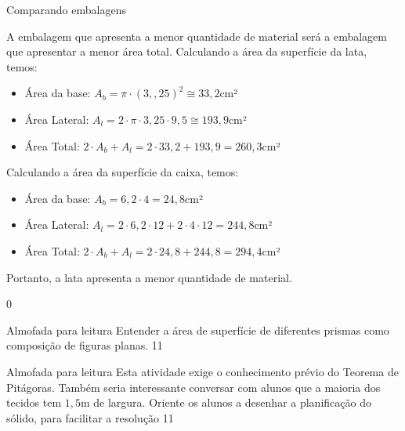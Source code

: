 \begin{answer}{Comparando embalagens}
{
A embalagem que apresenta a menor quantidade de material será a embalagem que apresentar a menor área total. Calculando a área da superfície da lata, temos:
\begin{itemize}
\item Área da base: $A_b=\pi\cdot(3,{,}25)^2\cong33{,}2$cm²  
\item Área Lateral: $A_l=2\cdot\pi\cdot3{,}25\cdot9,5\cong193,9$cm²
\item Área Total: $2\cdot A_b+A_l=2\cdot33{,}2+193{,}9=260{,}3$cm²
\end{itemize}

Calculando a área da superfície da caixa, temos:
\begin{itemize}
\item Área da base: $A_b=6{,}2\cdot4=24{,}8$cm²
\item Área Lateral: $A_l=2\cdot6{,}2\cdot12+2\cdot4\cdot12=244{,}8$cm²
\item Área Total: $2\cdot A_b+A_l=2\cdot24{,}8+244{,}8=294{,}4$cm²
\end{itemize}
Portanto, a lata apresenta a menor quantidade de material.
}{0}
\end{answer}
\begin{objectives}{Almofada para leitura}
{
Entender a área de superfície de diferentes prismas como composição de figuras planas. 
}{1}{1}
\end{objectives}
\begin{sugestions}{Almofada para leitura}
{
Esta atividade exige o conhecimento prévio do Teorema de Pitágoras. Também seria interessante conversar com alunos que a maioria dos tecidos tem $1{,}5$m de largura. Oriente os alunos a desenhar a planificação do sólido, para facilitar a resolução
}{1}{1}
\end{sugestions}
\clearmargin
\marginpar{\vspace{.5em}}
